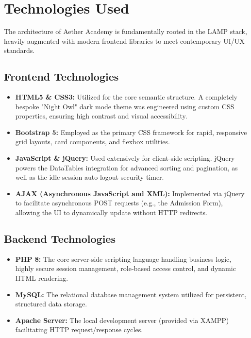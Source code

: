 \documentclass[12pt, a4paper]{report}
\begin{document}
\chapter{Technologies Used}
The architecture of Aether Academy is fundamentally rooted in the LAMP stack, heavily augmented with modern frontend libraries to meet contemporary UI/UX standards.

\section{Frontend Technologies}
\begin{itemize}
    \item \textbf{HTML5 \& CSS3:} Utilized for the core semantic structure. A completely bespoke "Night Owl" dark mode theme was engineered using custom CSS properties, ensuring high contrast and visual accessibility.
    \item \textbf{Bootstrap 5:} Employed as the primary CSS framework for rapid, responsive grid layouts, card components, and flexbox utilities.
    \item \textbf{JavaScript \& jQuery:} Used extensively for client-side scripting. jQuery powers the DataTables integration for advanced sorting and pagination, as well as the idle-session auto-logout security timer.
    \item \textbf{AJAX (Asynchronous JavaScript and XML):} Implemented via jQuery to facilitate asynchronous POST requests (e.g., the Admission Form), allowing the UI to dynamically update without HTTP redirects.
\end{itemize}

\section{Backend Technologies}
\begin{itemize}
    \item \textbf{PHP 8:} The core server-side scripting language handling business logic, highly secure session management, role-based access control, and dynamic HTML rendering.
    \item \textbf{MySQL:} The relational database management system utilized for persistent, structured data storage.
    \item \textbf{Apache Server:} The local development server (provided via XAMPP) facilitating HTTP request/response cycles.
\end{itemize}
\end{document}

